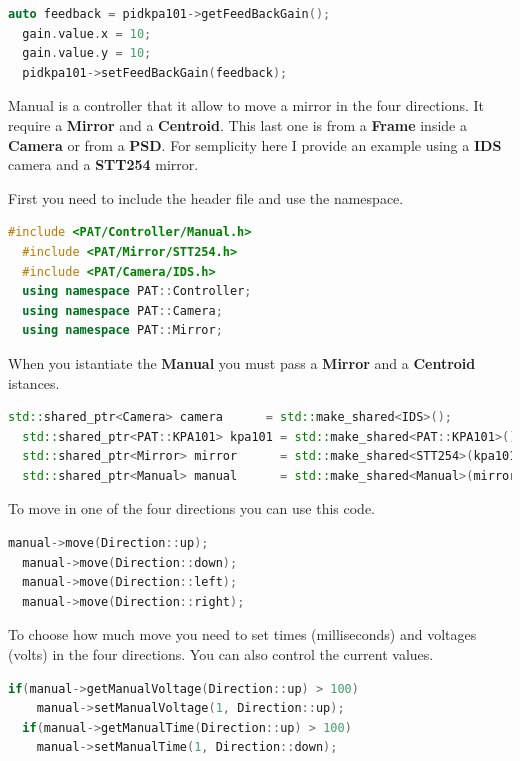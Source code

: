 \begin{lstlisting}[language=c++, gobble=2]
  auto feedback = pidkpa101->getFeedBackGain();
  gain.value.x = 10;
  gain.value.y = 10;
  pidkpa101->setFeedBackGain(feedback);
\end{lstlisting}



Manual is a controller that it allow to move a mirror in the four
directions. It require a \textbf{Mirror} and a \textbf{Centroid}. This
last one is from a \textbf{Frame} inside a \textbf{Camera} or from a
\textbf{PSD}. For semplicity here I provide an example using a
\textbf{IDS} camera and a \textbf{STT254} mirror.

First you need to include the header file and use the namespace.

\begin{lstlisting}[language=c++, gobble=2]
  #include <PAT/Controller/Manual.h>
  #include <PAT/Mirror/STT254.h>
  #include <PAT/Camera/IDS.h>
  using namespace PAT::Controller;
  using namespace PAT::Camera;
  using namespace PAT::Mirror;
\end{lstlisting}


When you istantiate the \textbf{Manual} you must pass a \textbf{Mirror}
and a \textbf{Centroid} istances.

\begin{lstlisting}[language=c++, gobble=2]
  std::shared_ptr<Camera> camera      = std::make_shared<IDS>();
  std::shared_ptr<PAT::KPA101> kpa101 = std::make_shared<PAT::KPA101>();
  std::shared_ptr<Mirror> mirror      = std::make_shared<STT254>(kpa101);
  std::shared_ptr<Manual> manual      = std::make_shared<Manual>(mirror, camera->getFrame()->getCentroid());
\end{lstlisting}


To move in one of the four directions you can use this code.

\begin{lstlisting}[language=c++, gobble=2]
  manual->move(Direction::up);
  manual->move(Direction::down);
  manual->move(Direction::left);
  manual->move(Direction::right);
\end{lstlisting}


To choose how much move you need to set times (milliseconds) and
voltages (volts) in the four directions. You can also control the
current values.

\begin{lstlisting}[language=c++, gobble=2]
  if(manual->getManualVoltage(Direction::up) > 100)
    manual->setManualVoltage(1, Direction::up);
  if(manual->getManualTime(Direction::up) > 100)
    manual->setManualTime(1, Direction::down);
\end{lstlisting}


